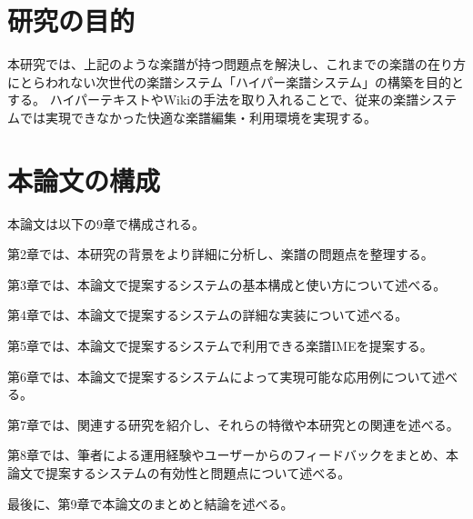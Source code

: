 \section{研究の目的}
本研究では、上記のような楽譜が持つ問題点を解決し、これまでの楽譜の在り方にとらわれない次世代の楽譜システム「ハイパー楽譜システム」の構築を目的とする。
ハイパーテキストやWikiの手法を取り入れることで、従来の楽譜システムでは実現できなかった快適な楽譜編集・利用環境を実現する。

\section{本論文の構成}

本論文は以下の9章で構成される。

第2章では、本研究の背景をより詳細に分析し、楽譜の問題点を整理する。

第3章では、本論文で提案するシステムの基本構成と使い方について述べる。

第4章では、本論文で提案するシステムの詳細な実装について述べる。

第5章では、本論文で提案するシステムで利用できる楽譜IMEを提案する。

第6章では、本論文で提案するシステムによって実現可能な応用例について述べる。

第7章では、関連する研究を紹介し、それらの特徴や本研究との関連を述べる。

第8章では、筆者による運用経験やユーザーからのフィードバックをまとめ、本論文で提案するシステムの有効性と問題点について述べる。

最後に、第9章で本論文のまとめと結論を述べる。
